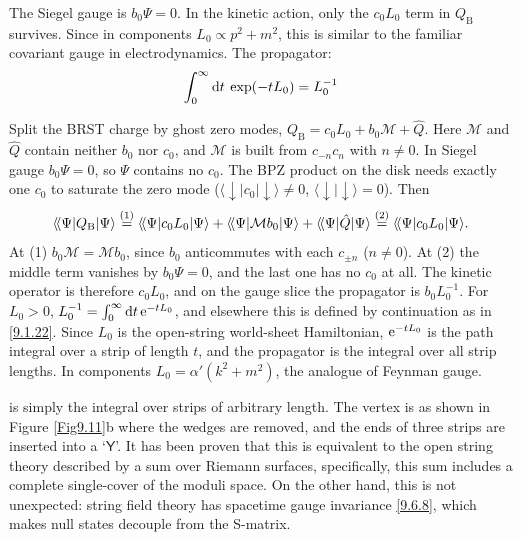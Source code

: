 The Siegel gauge is $b_{0} \Psi=0 $.
In the kinetic action, only the $c_{0} L_{0}$ term in $Q_{\mathrm{B}}$ survives. 
Since in components $L_{0} \propto p^{2}+m^{2}$, this is similar to the familiar covariant gauge in electrodynamics.
The propagator:
\begin{equation}
	\int_{0}^{\infty} \mathrm{d} t \: \exp (-t L_{0}) = L_{0}^{-1} \label{9.6.13}
\end{equation}
\begin{tcolorbox}[breakable]
	\begin{remark}
		Split the BRST charge by ghost zero modes, $Q_{\mathrm B}=c_0L_0+b_0\mathcal M+\hat Q$. Here $\mathcal M$ and $\hat Q$ contain neither $b_0$ nor $c_0$, and $\mathcal M$ is built from $c_{-n}c_n$ with $n\ne0$. In Siegel gauge $b_0\Psi=0$, so $\Psi$ contains no $c_0$. The BPZ product on the disk needs exactly one $c_0$ to saturate the zero mode ($\langle{\downarrow}|c_0|{\downarrow}\rangle\neq0$, $\langle{\downarrow}|{\downarrow}\rangle=0$). Then
		\begin{equation*}
			\langle\!\langle\Psi|Q_{\mathrm B}|\Psi\rangle\overset{(1)}{=}\langle\!\langle\Psi|c_0L_0|\Psi\rangle+\langle\!\langle\Psi|\mathcal Mb_0|\Psi\rangle+\langle\!\langle\Psi|\hat Q|\Psi\rangle\overset{(2)}{=}\langle\!\langle\Psi|c_0L_0|\Psi\rangle .
		\end{equation*}
		At (1) $b_0\mathcal M=\mathcal Mb_0$, since $b_0$ anticommutes with each $c_{\pm n}$ ($n\ne0$). At (2) the middle term vanishes by $b_0\Psi=0$, and the last one has no $c_0$ at all. The kinetic operator is therefore $c_0L_0$, and on the gauge slice the propagator is $b_0L_0^{-1}$. For $L_0>0$, $L_0^{-1}=\int_0^\infty\mathrm{d} t\,\mathrm{e}^{-tL_0}$, and elsewhere this is defined by continuation as in \eqref{9.1.22}. Since $L_0$ is the open-string world-sheet Hamiltonian, $\mathrm{e}^{-tL_0}$ is the path integral over a strip of length $t$, and the propagator is the integral over all strip lengths. In components $L_0=\alpha'(k^2+m^2)$, the analogue of Feynman gauge.
	\end{remark}
\end{tcolorbox}
is simply the integral over strips of arbitrary length. The vertex is as shown in Figure \ref{Fig9.11}b where the wedges are removed, and the ends of three strips are inserted into a `$\mathsf{Y}$'.
It has been proven that this is equivalent to the open string theory described by a sum over Riemann surfaces, specifically, this sum includes a complete single-cover of the moduli space. 
On the other hand, this is not unexpected: string field theory has spacetime gauge invariance \eqref{9.6.8}, which makes null states decouple from the S-matrix.
